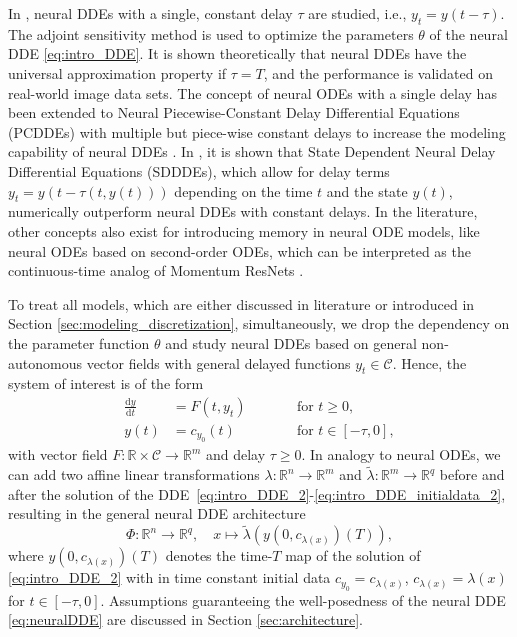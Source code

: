 \documentclass[10pt]{article}
\numberwithin{equation}{section}
\newcommand*{\dd}{\mathrm{d}}
\begin{document}
	In \cite{Zhu2021}, neural DDEs with a single, constant delay $\tau$ are studied, i.e., $y_t = y(t-\tau)$. The adjoint sensitivity method is used to optimize the parameters $\theta$ of the neural DDE \eqref{eq:intro_DDE}. It is shown theoretically that neural DDEs have the universal approximation property if $\tau = T$, and the performance is validated on real-world image data sets. The concept of neural ODEs with a single delay has been extended to Neural Piecewise-Constant Delay Differential Equations (PCDDEs) with multiple but piece-wise constant delays to increase the modeling capability of neural DDEs \cite{Zhu2022}. In \cite{Monsel2024}, it is shown that State Dependent Neural Delay Differential Equations (SDDDEs), which allow for delay terms $y_t = y(t-\tau(t,y(t)))$ depending on the time $t$ and the state $y(t)$, numerically outperform neural DDEs with constant delays. In the literature, other concepts also exist for introducing memory in neural ODE models, like neural ODEs based on second-order ODEs, which can be interpreted as the continuous-time analog of Momentum ResNets \cite{RuizBalet2022,Sander2021}.
	
	To treat all models, which are either discussed in literature or introduced in Section \ref{sec:modeling_discretization}, simultaneously, we drop the dependency on the parameter function $\theta$ and study neural DDEs based on general non-autonomous vector fields with general delayed functions $y_t \in\mathcal{C}$. Hence, the system of interest is of the form  
	\begin{align}
		\label{eq:intro_DDE_2} \frac{\dd y}{\dd t} &= F(t,y_t) \qquad &&\text{for } t\geq 0, \\  
		\label{eq:intro_DDE_initialdata_2} y(t) &= c_{y_0}(t) &&\text{for } t \in [-\tau,0],
	\end{align}
	with vector field $F:\mathbb{R}\times \mathcal{C}\rightarrow \mathbb{R}^m$ and delay $\tau \geq 0$. In analogy to neural ODEs, we can add two affine linear transformations  $\lambda:\mathbb{R}^n\rightarrow \mathbb{R}^m$ and $\tilde \lambda:\mathbb{R}^m\rightarrow \mathbb{R}^q$ before and after the solution of the DDE~\eqref{eq:intro_DDE_2}-\eqref{eq:intro_DDE_initialdata_2}, resulting in the general neural DDE architecture 
	\begin{equation} \label{eq:neuralDDE}
		\Phi: \mathbb{R}^n \rightarrow \mathbb{R}^q, \quad x \mapsto \tilde{\lambda}(y(0,c_{\lambda(x)})(T)),
	\end{equation}
	where $y(0,c_{\lambda(x)})(T)$ denotes the time-$T$ map of the solution of \eqref{eq:intro_DDE_2} with in time constant initial data $c_{y_0} = c_{\lambda(x)}$, $c_{\lambda(x)} =  \lambda(x)$ for $t\in [-\tau,0]$. Assumptions guaranteeing the well-posedness of the neural DDE \eqref{eq:neuralDDE} are discussed in Section \ref{sec:architecture}. \medskip
	
\end{document}
